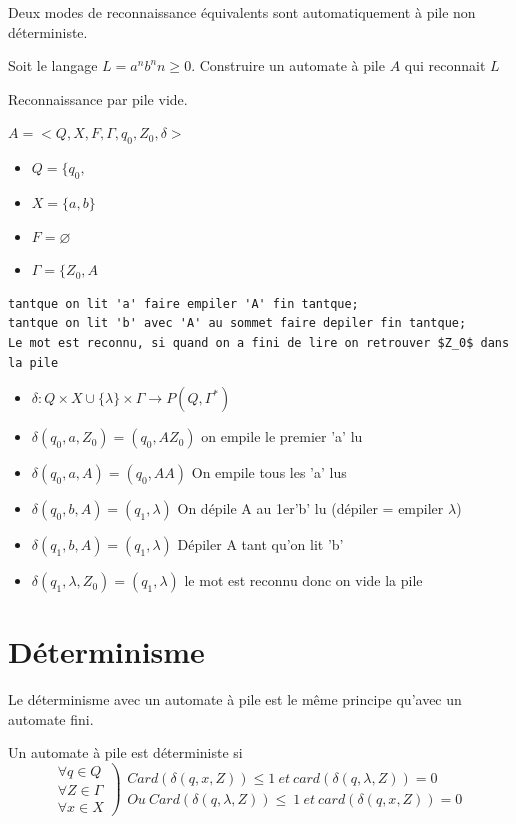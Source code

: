 Deux modes de reconnaissance équivalents sont automatiquement à pile non déterministe.
	
\begin{exemple}
	Soit le langage $L=a^nb^n n\geq0$. Construire un automate à pile $A$ qui reconnait $L$

	Reconnaissance par pile vide.

	$A=<Q,X,F,\Gamma,q_0,Z_0,\delta>$
	\begin{itemize}
		\item $Q=\{q_0,$
		\item $X=\{a,b\}$
		\item $F=\varnothing$
		\item $\Gamma=\{Z_0,A$
	\end{itemize}
	\begin{lstlisting}[language=algo, numbers=none, framerule=0pt]
tantque on lit 'a' faire empiler 'A' fin tantque;
tantque on lit 'b' avec 'A' au sommet faire depiler fin tantque;
Le mot est reconnu, si quand on a fini de lire on retrouver $Z_0$ dans la pile 
\end{lstlisting}

\begin{itemize}
	\item $\delta : Q\times X\cup\{\lambda\}\times\Gamma \rightarrow P(Q,\Gamma^*)$\\
	\item $\delta(q_0,a,Z_0) = (q_0,AZ_0)$ on empile le premier 'a' lu 
	\item $\delta(q_0,a,A) = (q_0,AA)$ On empile tous les 'a' lus
	\item $\delta(q_0,b,A) = (q_1,\lambda)$ On dépile A au 1er'b' lu (dépiler = empiler $\lambda$)
	\item $\delta(q_1,b,A) = (q_1,\lambda)$ Dépiler A tant qu'on lit 'b'
	\item $\delta(q_1,\lambda,Z_0) = (q_1,\lambda)$ le mot est reconnu donc on vide la pile 
\end{itemize}
\end{exemple}
	\section{Déterminisme}
	Le déterminisme avec un automate à pile est le même principe qu'avec un automate fini.

	Un automate à pile est déterministe si 
	\begin{displaymath}
		\left.\begin{array}{c}
			\forall q \in Q\\
			\forall Z \in \Gamma\\
			\forall x \in X
		\end{array}\right)
		\begin{array}{c}
		Card(\delta(q,x,Z)) \leq 1\ et\ card(\delta(q,\lambda,Z)) = 0\\
		Ou\ Card(\delta(q,\lambda,Z)) \leq\ 1\ et\ card(\delta(q,x,Z)) = 0
		\end{array}
	\end{displaymath}


